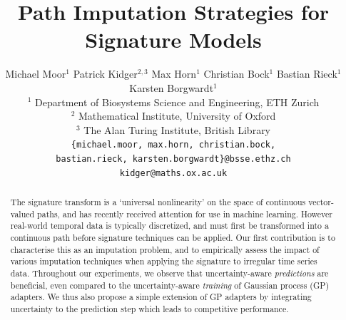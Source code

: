 \documentclass{article}
\title{Path Imputation Strategies for Signature Models}
\author{
    Michael Moor$^1$
    \And
	Patrick Kidger$^{2, 3}$
	\And
	Max Horn$^1$
	\And
	Christian Bock$^1$
	\And
	Bastian Rieck$^1$
	\And
	Karsten Borgwardt$^1$
	\AND \\[-12pt]
	\null$^1$ Department of Biosystems Science and Engineering, ETH Zurich
	\\
	\null$^2$ Mathematical Institute, University of Oxford \\
	\null$^3$ The Alan Turing Institute, British Library
	\\
	\hspace{-6.5em}\texttt{\{michael.moor, max.horn, christian.bock,}
	\\
	\hspace{6.5em}\texttt{bastian.rieck, karsten.borgwardt\}@\hspace{0.1pt}bsse.ethz.ch}
	\\
	\texttt{kidger@\hspace{0.1pt}maths.ox.ac.uk}
} %
\begin{document}
\maketitle

\begin{abstract}
The signature transform is a `universal nonlinearity' on the space of continuous vector-valued paths, and has recently received attention for use in machine learning. However real-world temporal data is typically discretized, and must first be transformed into a continuous path before signature techniques can be applied. %
Our first contribution is to characterise this as an imputation problem, and to empirically assess the impact of various imputation techniques when applying the signature to irregular time series data. Throughout our experiments, we observe that uncertainty-aware \emph{predictions} are beneficial, even compared to the uncertainty-aware \emph{training} of Gaussian process (GP) adapters. We thus also propose a simple extension of GP adapters by integrating uncertainty to the prediction step which leads to competitive performance.
\end{abstract} %


\end{document}
